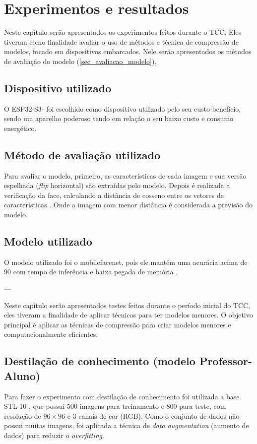 \chapter{Experimentos e resultados}

Neste capítulo serão apresentados os experimentos feitos durante o TCC. Eles tiveram como
finalidade avaliar o uso de métodos e técnica de compressão de modelos, focado em dispositivos
embarcados. Nele serão apresentados os métodos de avaliação do modelo (\autoref{sec_avaliacao_modelo}),

\section{Dispositivo utilizado}\label{sec_dispositivo}
O ESP32-S3- foi escolhido como dispositivo utilizado pelo seu custo-benefício, sendo um aparelho poderoso
tendo em relação o seu baixo custo e consumo energético.

\section{Método de avaliação utilizado}\label{sec_avaliacao_modelo}
Para avaliar o modelo, primeiro, as características de cada imagem e sua versão espelhada
(\textit{flip} horizontal) são extraídas pelo modelo. Depois é realizada a verificação da face,
calculando a distância de cosseno entre os vetores de características \cite{triplet_distillation_face_recognition}.
Onde a imagem com menor distância é considerada a previsão do modelo.

\section{Modelo utilizado}\label{sec_modelo_utilizado}
O modelo utilizado foi o mobilefacenet, pois ele mantém uma acurácia acima de 90%
com tempo de inferência e baixa pegada de memória \cite{}.

---

Neste capítulo serão apresentados testes feitos durante o período inicial do TCC, eles tiveram a finalidade de aplicar técnicas para ter modelos menores.
O objetivo principal é aplicar as técnicas de compressão para criar modelos menores e computacionalmente eficientes.

\section{Destilação de conhecimento (modelo Professor-Aluno)}
Para fazer o experimento com destilação de conhecimento foi utilizada a base STL-10 \cite{stl10}, que possui 500 imagens para
treinamento e 800 para teste, com resolução de $96 \times 96$ e 3 canais de cor (RGB). Como o conjunto de dados
não possui muitas imagens, foi aplicada a técnica de \textit{data augmentation} (aumento de dados) para reduzir o
\textit{overfitting}.


